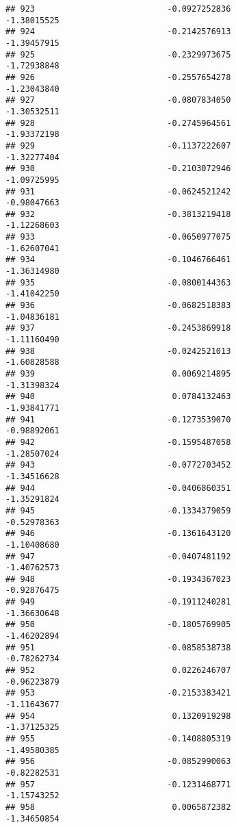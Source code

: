 \documentclass[
]{article}
\begin{document}
\begin{verbatim}
## 923                           -0.0927252836                -1.38015525
## 924                           -0.2142576913                -1.39457915
## 925                           -0.2329973675                -1.72938848
## 926                           -0.2557654278                -1.23043840
## 927                           -0.0807834050                -1.30532511
## 928                           -0.2745964561                -1.93372198
## 929                           -0.1137222607                -1.32277404
## 930                           -0.2103072946                -1.09725995
## 931                           -0.0624521242                -0.98047663
## 932                           -0.3813219418                -1.12268603
## 933                           -0.0650977075                -1.62607041
## 934                           -0.1046766461                -1.36314980
## 935                           -0.0800144363                -1.41042250
## 936                           -0.0682518383                -1.04836181
## 937                           -0.2453869918                -1.11160490
## 938                           -0.0242521013                -1.60828588
## 939                            0.0069214895                -1.31398324
## 940                            0.0784132463                -1.93841771
## 941                           -0.1273539070                -0.98892061
## 942                           -0.1595487058                -1.28507024
## 943                           -0.0772703452                -1.34516628
## 944                           -0.0406860351                -1.35291824
## 945                           -0.1334379059                -0.52978363
## 946                           -0.1361643120                -1.10408680
## 947                           -0.0407481192                -1.40762573
## 948                           -0.1934367023                -0.92876475
## 949                           -0.1911240281                -1.36630648
## 950                           -0.1805769905                -1.46202894
## 951                           -0.0858538738                -0.78262734
## 952                            0.0226246707                -0.96223879
## 953                           -0.2153383421                -1.11643677
## 954                            0.1320919298                -1.37125325
## 955                           -0.1408805319                -1.49580385
## 956                           -0.0852990063                -0.82282531
## 957                           -0.1231468771                -1.15743252
## 958                            0.0065872382                -1.34650854

\end{verbatim}
\end{document}
